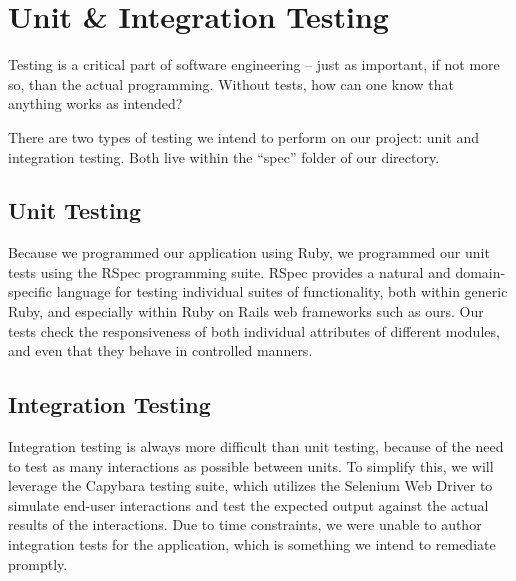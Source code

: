 \chapter{Unit \& Integration Testing}

Testing is a critical part of software engineering -- just as important,
if not more so, than the actual programming. Without tests, how can one
know that anything works as intended?

There are two types of testing we intend to perform on our project: unit
and integration testing. Both live within the ``spec'' folder of our
directory.

\section{Unit Testing}

Because we programmed our application using Ruby, we programmed
our unit tests using the RSpec programming suite. RSpec provides
a natural and domain-specific language for testing individual suites
of functionality, both within generic Ruby, and especially within
Ruby on Rails web frameworks such as ours. Our tests check the 
responsiveness of both individual attributes of different modules,
and even that they behave in controlled manners. 

\section{Integration Testing}

Integration testing is always more difficult than unit testing, because
of the need to test as many interactions as possible between units. 
To simplify this, we will leverage the Capybara testing suite, which
utilizes the Selenium Web Driver to simulate end-user interactions
and test the expected output against the actual results of the
interactions. Due to time constraints, we were unable to author
integration tests for the application, which is something we intend
to remediate promptly.